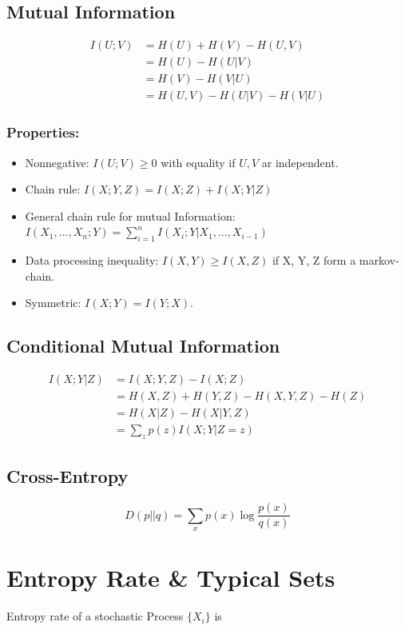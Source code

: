 \documentclass[10pt,a4paper,landscape]{article}
\begin{document}
\begin{multicols*}{4}
\subsection{Mutual Information}
\begin{align*}
I(U; V) &= H(U) + H(V) - H(U,V)\\
		&= H(U) - H(U | V)\\
		&= H(V) - H(V | U)\\
		&= H(U,V) - H(U | V) - H (V | U)
\end{align*}

\subsubsection{Properties:}
\begin{itemize}
	\item Nonnegative: $I(U;V) \geq 0$ with equality if $U, V$ ar independent.
	\item Chain rule: $I(X; Y, Z) = I(X;Z) + I(X; Y | Z)$
	\item General chain rule for mutual Information: $I(X_1, ..., X_n; Y) = \sum_{i=1}^n I(X_i; Y | X_1, ..., X_{i-1})$
	\item Data processing inequality: $I(X,Y) \geq I(X, Z)$ if X, Y, Z form a markov-chain.
	\item Symmetric: $I(X;Y) = I(Y;X)$.
\end{itemize}

\subsection{Conditional Mutual Information}
\begin{align*}
I(X;Y|Z) 	&= I(X;Y,Z) - I(X;Z)\\
			&= H(X,Z) + H(Y,Z) - H(X,Y,Z) - H(Z)\\
			&= H(X|Z) - H(X|Y,Z)\\
			&= \sum_z p(z) I(X;Y|Z=z)
\end{align*}
\subsection{Cross-Entropy}
$$ D(p || q) = \sum_x p(x) \log \frac{p(x)}{q(x)}$$

\section{Entropy Rate \& Typical Sets}
Entropy rate of a stochastic Process $\{X_i\}$ is


\end{multicols*}
\end{document}
